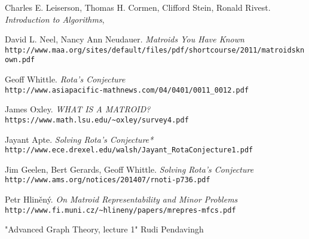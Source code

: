 
\begin{thebibliography}{8}

Charles E. Leiserson, Thomas H. Cormen, Clifford Stein, Ronald Rivest.
\textit{Introduction to Algorithms}, 

David L. Neel, Nancy Ann Neudauer. \textit{Matroids You Have Known}\\
\texttt{http://www.maa.org/sites/default/files/pdf/shortcourse/2011/matroidsknown.pdf}

Geoff Whittle. \textit{Rota's Conjecture}\\
\texttt{http://www.asiapacific-mathnews.com/04/0401/0011\_0012.pdf}

James Oxley. \textit{WHAT IS A MATROID?}\\
\texttt{https://www.math.lsu.edu/\~{}oxley/survey4.pdf}

Jayant Apte. \textit{Solving Rota's Conjecture*}\\ 
\texttt{http://www.ece.drexel.edu/walsh/Jayant\_RotaConjecture1.pdf}

Jim Geelen, Bert Gerards, Geoff Whittle. \textit{Solving Rota's Conjecture}\\
\texttt{http://www.ams.org/notices/201407/rnoti-p736.pdf}

Petr Hlin\v{e}n\'{y}. \textit{On Matroid Representability and Minor Problems}\\
\texttt{http://www.fi.muni.cz/\~{}hlineny/papers/mrepres-mfcs.pdf}

"Advanced Graph Theory, lecture 1" Rudi Pendavingh

\end{thebibliography}
